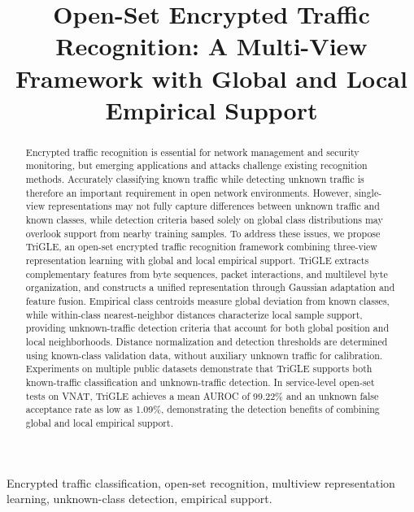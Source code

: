 \documentclass[journal]{IEEEtran}
\title{Open-Set Encrypted Traffic Recognition: A Multi-View Framework with Global and Local Empirical Support}
\author{}
\begin{document}
\maketitle
\setcounter{section}{0}
\begin{abstract}
Encrypted traffic recognition is essential for network management and security monitoring, but emerging applications and attacks challenge existing recognition methods. Accurately classifying known traffic while detecting unknown traffic is therefore an important requirement in open network environments. However, single-view representations may not fully capture differences between unknown traffic and known classes, while detection criteria based solely on global class distributions may overlook support from nearby training samples. To address these issues, we propose TriGLE, an open-set encrypted traffic recognition framework combining three-view representation learning with global and local empirical support. TriGLE extracts complementary features from byte sequences, packet interactions, and multilevel byte organization, and constructs a unified representation through Gaussian adaptation and feature fusion. Empirical class centroids measure global deviation from known classes, while within-class nearest-neighbor distances characterize local sample support, providing unknown-traffic detection criteria that account for both global position and local neighborhoods. Distance normalization and detection thresholds are determined using known-class validation data, without auxiliary unknown traffic for calibration. Experiments on multiple public datasets demonstrate that TriGLE supports both known-traffic classification and unknown-traffic detection. In service-level open-set tests on VNAT, TriGLE achieves a mean AUROC of 99.22\% and an unknown false acceptance rate as low as 1.09\%, demonstrating the detection benefits of combining global and local empirical support.
\end{abstract}

\begin{IEEEkeywords}
Encrypted traffic classification, open-set recognition, multiview representation learning, unknown-class detection, empirical support.
\end{IEEEkeywords}
\end{document}
